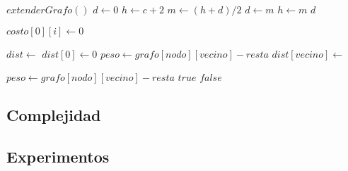 \begin{algorithm}
\label{ej2}         %
\begin{algorithmic}
	\State $extenderGrafo()$
    \State $d \gets 0$
	\State $h \gets c + 2$
		\State $m \gets (h + d)/2$
			\State $d \gets m$
		\Else
			\State $h \gets m$
		\EndIf
	\EndWhile
	\Return $d$
\EndFunction
\end{algorithmic}
\end{algorithm}

\begin{algorithm}
\begin{algorithmic}
	\For{$i \in [1..n)$}
		\State {}
		\State $costo[0][i] \gets 0$
	\EndFor
\EndFunction
\end{algorithmic}
\end{algorithm}

\begin{algorithm}
\begin{algorithmic}
	\State $dist \gets$ 
	\State $dist[0] \gets 0$
	\For{$i \in [1..n)$}
				\State $peso \gets grafo[nodo][vecino] - resta$
				\State $dist[vecino] \gets$ 
			\EndFor
		\EndFor
	\EndFor
	\Return {}
\EndFunction
\end{algorithmic}
\end{algorithm}

\begin{algorithm}
\begin{algorithmic}
			\State $peso \gets grafo[nodo][vecino] - resta$
				\Return $true$
			\EndIf
		\EndFor
	\EndFor
	\Return $false$
\EndFunction
\end{algorithmic}
\end{algorithm}

\newpage

\subsection{Complejidad}

\subsection{Experimentos}